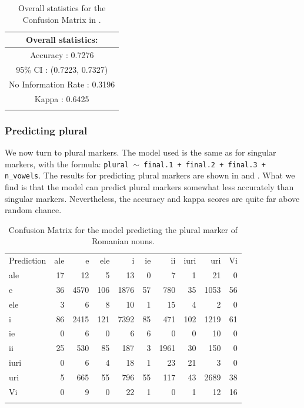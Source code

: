 \begin{table}[!htpb]
  \centering
  \begin{tabular}{c}
    \lsptoprule
    Overall statistics: \\
    \midrule
    Accuracy : 0.7276                                 \\
    95\% CI : (0.7223, 0.7327)                        \\
    No Information Rate : 0.3196                      \\
    Kappa : 0.6425                                    \\
    \lspbottomrule
  \end{tabular}
  \caption{Overall statistics for the Confusion Matrix in .}\label{tab:singular-romanian-stats}
\end{table}

\subsubsection{Predicting plural}

We now turn to plural markers. The model used is the same as for singular markers, with the formula: \texttt{plural $\sim$ final.1 + final.2 + final.3 + n\_vowels}. The results for predicting plural markers are shown in  and . What we find is that the model can predict plural markers somewhat less accurately than singular markers. Nevertheless, the accuracy and kappa scores are quite far above random chance.

\begin{table}[!htpb]
  \centering
  \begin{tabular}{lrrrrrrrrr}
    \lsptoprule
    \multicolumn{10}{c}{Reference}                                      \\
    \midrule
    Prediction & ale & e    & ele & i    & ie & ii   & iuri & uri  & Vi \\
    ale        & 17  & 12   & 5   & 13   & 0  & 7    & 1    & 21   & 0  \\
    e          & 36  & 4570 & 106 & 1876 & 57 & 780  & 35   & 1053 & 56 \\
    ele        & 3   & 6    & 8   & 10   & 1  & 15   & 4    & 2    & 0  \\
    i          & 86  & 2415 & 121 & 7392 & 85 & 471  & 102  & 1219 & 61 \\
    ie         & 0   & 6    & 0   & 6    & 6  & 0    & 0    & 10   & 0  \\
    ii         & 25  & 530  & 85  & 187  & 3  & 1961 & 30   & 150  & 0  \\
    iuri       & 0   & 6    & 4   & 18   & 1  & 23   & 21   & 3    & 0  \\
    uri        & 5   & 665  & 55  & 796  & 55 & 117  & 43   & 2689 & 38 \\
    Vi         & 0   & 9    & 0   & 22   & 1  & 0    & 1    & 12   & 16 \\
    \lspbottomrule
  \end{tabular}
  \caption{Confusion Matrix for the model predicting the plural marker of Romanian nouns.}
  \label{tab:plural-romanian}
\end{table}

